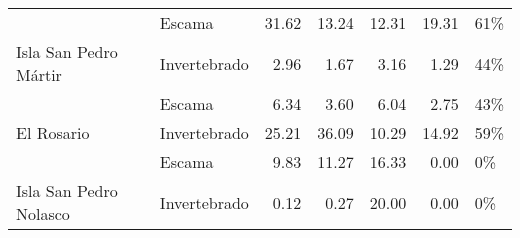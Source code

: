 \begin{table}[!h]
\begin{tabular}[t]{llrrrrl}
\cmidrule{1-7}
 & Escama & 31.62 & 13.24 & 12.31 & 19.31 & 61\%\\
\cmidrule{2-7}
\multirow{-2}{*}{\raggedright\arraybackslash Isla San Pedro Mártir} & Invertebrado & 2.96 & 1.67 & 3.16 & 1.29 & 44\%\\
\cmidrule{1-7}
 & Escama & 6.34 & 3.60 & 6.04 & 2.75 & 43\%\\
\cmidrule{2-7}
\multirow{-2}{*}{\raggedright\arraybackslash El Rosario} & Invertebrado & 25.21 & 36.09 & 10.29 & 14.92 & 59\%\\
\cmidrule{1-7}
 & Escama & 9.83 & 11.27 & 16.33 & 0.00 & 0\%\\
\cmidrule{2-7}
\multirow{-2}{*}{\raggedright\arraybackslash Isla San Pedro Nolasco} & Invertebrado & 0.12 & 0.27 & 20.00 & 0.00 & 0\%\\
\bottomrule
\end{tabular}
\end{table}